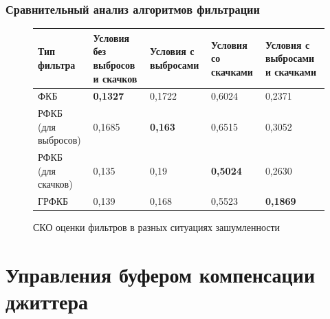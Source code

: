 \documentclass[10pt,pdf,hyperref={unicode}]{beamer}
\begin{document}
\begin{frame}
\frametitle{Сравнительный анализ алгоритмов фильтрации}
\begin{scriptsize}

\pgfplotsset{width=10cm, height=4cm, compat=newest}
\begin{figure} [!h]
  \center
{}
\caption*{СКО оценки фильтров в разных ситуациях зашумленности}


\begin{tabular}{|p{1.5cm}|p{1.5cm}|p{1.5cm}|p{1.5cm}|p{1.5cm}|}
    \hline
    Тип фильтра        & Условия без выбросов и скачков & Условия с выбросами & Условия со скачками  & Условия с выбросами и скачками \\ \hline
    ФКБ                 & \textbf{0,1327}                 & 0,1722                   & 0,6024                 & 0,2371                           \\ \hline
    РФКБ (для выбросов) & 0,1685                          &  \textbf{0,163}       & 0,6515                 & 0,3052                           \\ \hline
    РФКБ (для скачков)   & 0,135                           & 0,19               & \textbf{0,5024}                & 0,2630                             \\ \hline
    ГРФКБ               & 0,139                          & 0,168               &   0,5523            & \textbf{0,1869}                           \\ \hline
    \end{tabular}
\end{figure}
\end{scriptsize}
\end{frame}


\section{Управления буфером компенсации джиттера}
\end{document}
